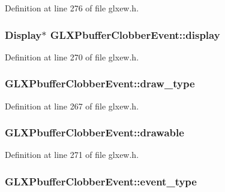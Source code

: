 Definition at line 276 of file glxew.\-h.

\hypertarget{struct_g_l_x_pbuffer_clobber_event_aeb49bb93cc59448e75d66170a39596d1}{
\subsubsection[{display}]{\setlength{\rightskip}{0pt plus 5cm}Display$\ast$ G\-L\-X\-Pbuffer\-Clobber\-Event\-::display}}\label{struct_g_l_x_pbuffer_clobber_event_aeb49bb93cc59448e75d66170a39596d1}


Definition at line 270 of file glxew.\-h.

\hypertarget{struct_g_l_x_pbuffer_clobber_event_a243f92b79d3cfbde73eab02815be2320}{
\subsubsection[{draw\-\_\-type}]{ G\-L\-X\-Pbuffer\-Clobber\-Event\-::draw\-\_\-type}}\label{struct_g_l_x_pbuffer_clobber_event_a243f92b79d3cfbde73eab02815be2320}


Definition at line 267 of file glxew.\-h.

\hypertarget{struct_g_l_x_pbuffer_clobber_event_a388908b766e35205c1a461ea8b60439f}{
\subsubsection[{drawable}]{ G\-L\-X\-Pbuffer\-Clobber\-Event\-::drawable}}\label{struct_g_l_x_pbuffer_clobber_event_a388908b766e35205c1a461ea8b60439f}


Definition at line 271 of file glxew.\-h.

\hypertarget{struct_g_l_x_pbuffer_clobber_event_a30d7162d8d77246b01f5e610cda4da68}{
\subsubsection[{event\-\_\-type}]{ G\-L\-X\-Pbuffer\-Clobber\-Event\-::event\-\_\-type}}\label{struct_g_l_x_pbuffer_clobber_event_a30d7162d8d77246b01f5e610cda4da68}


